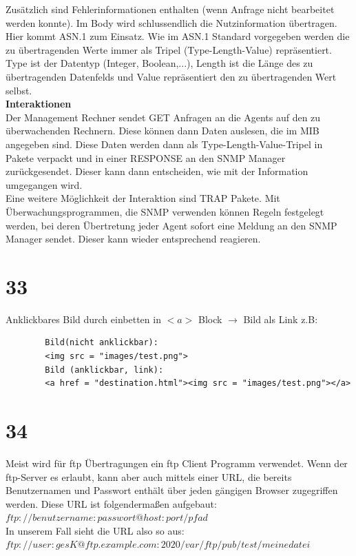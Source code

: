\documentclass[12pt, a4paper]{article}
\begin{document}
	Zusätzlich sind Fehlerinformationen enthalten (wenn Anfrage nicht bearbeitet werden konnte).
	Im Body wird schlussendlich die Nutzinformation übertragen. Hier kommt ASN.1 zum Einsatz. Wie im ASN.1 Standard vorgegeben werden die zu übertragenden Werte immer als Tripel (Type-Length-Value) repräsentiert. Type ist der Datentyp (Integer, Boolean,...), Length ist die Länge des zu übertragenden Datenfelds und Value repräsentiert den zu übertragenden Wert selbst.
	\\
	\textbf{Interaktionen}\\
	Der Management Rechner sendet GET Anfragen an die Agents auf den zu überwachenden Rechnern. Diese können dann Daten auslesen, die im MIB angegeben sind. Diese Daten werden dann als Type-Length-Value-Tripel in Pakete verpackt und in einer RESPONSE an den SNMP Manager zurückgesendet. Dieser kann dann entscheiden, wie mit der Information umgegangen wird.\\
	Eine weitere Möglichkeit der Interaktion sind TRAP Pakete. Mit Überwachungsprogrammen, die SNMP verwenden können Regeln festgelegt werden, bei deren Übertretung jeder Agent sofort eine Meldung an den SNMP Manager sendet. Dieser kann wieder entsprechend reagieren.
	


\section*{33}
	Anklickbares Bild durch einbetten in $<a>$ Block $\rightarrow$ Bild als Link z.B:
	\begin{verbatim}
		Bild(nicht anklickbar):
		<img src = "images/test.png">
		Bild (anklickbar, link):
		<a href = "destination.html"><img src = "images/test.png"></a>
	\end{verbatim}
	
		
\section*{34}
	Meist wird für ftp Übertragungen ein ftp Client Programm verwendet. Wenn der ftp-Server es erlaubt, kann aber auch
	mittels einer URL, die bereits Benutzernamen und Passwort enthält über jeden gängigen Browser zugegriffen werden.
	Diese URL ist folgendermaßen aufgebaut:\\
	$ftp://benutzername:passwort@host:port/pfad$\\
	In unserem Fall sieht die URL also so aus:\\
	$ftp://user:gesK@ftp.example.com:2020/var/ftp/pub/test/meinedatei$
	
\end{document}
